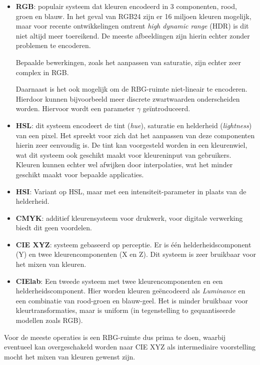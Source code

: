 \documentclass[twocolumn, a4paper]{article}
\begin{document}
\begin{itemize}
    \item \textbf{RGB}: populair systeem dat kleuren encodeerd in 3 componenten, rood, groen en blauw. In het geval van RGB24 zijn er 16 miljoen kleuren mogelijk, maar voor recente ontwikkelingen omtrent \emph{high dynamic range} (HDR) is dit niet altijd meer toereikend. De meeste afbeeldingen zijn hierin echter zonder problemen te encoderen. 

    Bepaalde bewerkingen, zoals het aanpassen van saturatie, zijn echter zeer complex in RGB. 

    Daarnaast is het ook mogelijk om de RBG-ruimte niet-lineair te encoderen. Hierdoor kunnen bijvoorbeeld meer discrete zwartwaarden onderscheiden worden. Hiervoor wordt een parameter $\gamma$ geïntroduceerd.
    
    \item \textbf{HSL}: dit systeem encodeert de tint (\emph{hue}), saturatie en helderheid (\emph{lightness}) van een pixel. Het spreekt voor zich dat het aanpassen van deze componenten hierin zeer eenvoudig is. De tint kan voorgesteld worden in een kleurenwiel, wat dit systeem ook geschikt maakt voor kleureninput van gebruikers. Kleuren kunnen echter wel afwijken door interpolaties, wat het minder geschikt maakt voor bepaalde applicaties.

    \item \textbf{HSI}: Variant op HSL, maar met een intensiteit-parameter in plaats van de helderheid.  
    \item \textbf{CMYK}: additief kleurensysteem voor drukwerk, voor digitale verwerking biedt dit geen voordelen. 
    \item \textbf{CIE XYZ}: systeem gebaseerd op perceptie. Er is één helderheidscomponent (Y) en twee kleurencomponenten (X en Z). Dit systeem is zeer bruikbaar voor het mixen van kleuren.
    \item \textbf{CIElab}: Een tweede systeem met twee kleurencomponenten en een helderheidscomponent. Hier worden kleuren geëncodeerd als \emph{Luminance} en een combinatie van rood-groen en blauw-geel. Het is minder bruikbaar voor kleurtransformaties, maar is uniform (in tegenstelling to gequantiseerde modellen zoals RGB).
\end{itemize}

Voor de meeste operaties is een RBG-ruimte dus prima te doen, waarbij eventueel kan overgeschakeld worden naar CIE XYZ als intermediaire voorstelling mocht het mixen van kleuren gewenst zijn. 
\end{document}
